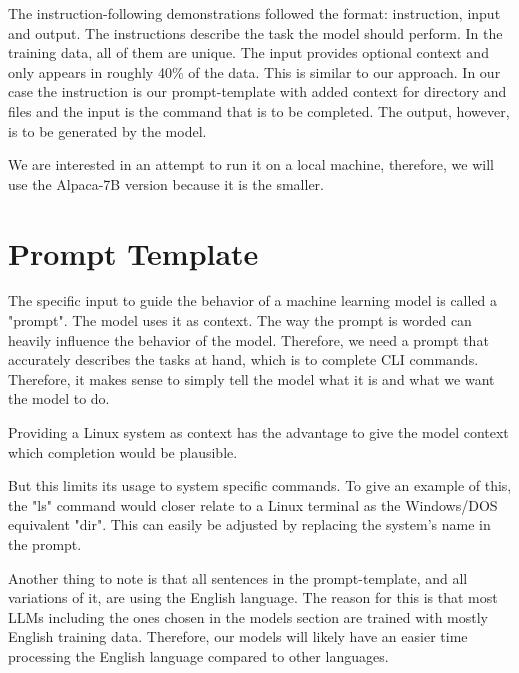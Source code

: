 The instruction-following demonstrations followed the format: instruction, input and output\cite{wang2023selfinstruct}. The instructions describe the task the model should perform. In the training data, all of them are unique. The input provides optional context and only appears in roughly 40\% of the data.
This is similar to our approach. In our case the instruction is our prompt-template with added context for directory and files and the input is the command that is to be completed. The output, however, is to be generated by the model.


We are interested in an attempt to run it on a local machine, therefore, 
we will use the Alpaca-7B version because it is the smaller. 



\pagebreak


\pagebreak








\section{Prompt Template}



The specific input to guide the behavior of a machine learning model is called a "prompt". The model uses it as context. The way the prompt is worded can heavily influence the behavior of the model. Therefore, we need a prompt that accurately describes the tasks at hand, which is to complete CLI commands. Therefore, it makes sense to simply tell the model what it is and what we want the model to do. 




Providing a Linux system as context has the advantage to give the model context which completion would be plausible. 


But this limits its usage to system specific commands. To give an example of this, the "ls" command would closer relate to  a Linux terminal as the Windows/DOS equivalent "dir". This can easily be adjusted by replacing the system's name in the prompt.


Another thing to note is that all sentences in the prompt-template, and all variations of it, are using the English language. The reason for this is that most LLMs including the ones chosen in the models section are trained with mostly English training data. Therefore, our models will likely have an easier time processing the English language compared to other languages. 



